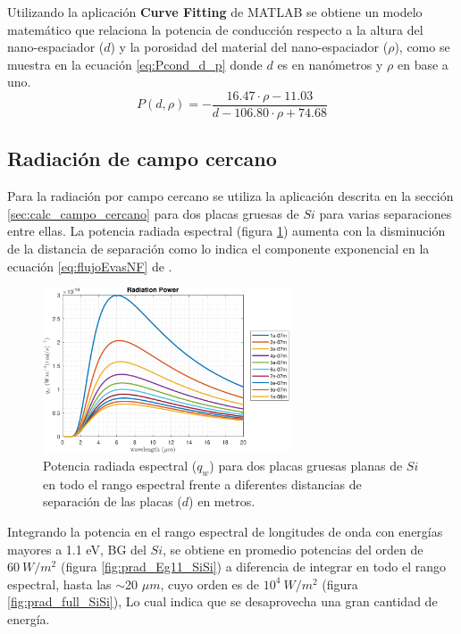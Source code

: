 Utilizando la aplicación \textbf{Curve Fitting} de MATLAB se obtiene un modelo matemático que relaciona la potencia de conducción respecto a la altura del nano-espaciador ($d$) y la porosidad del material del nano-espaciador ($\rho$), como se muestra en la ecuación \eqref{eq:Pcond_d_p} donde $d$ es en nanómetros y $\rho$ en base a uno.
\begin{equation}
P(d,\rho)=- \frac{  16.47\cdot \rho-11.03 }{d-106.80\cdot \rho +74.68}
\label{eq:Pcond_d_p}
\end{equation}\vspace{2cm}
\subsection{Radiación de campo cercano}
Para la radiación por campo cercano se utiliza la aplicación descrita en la sección \ref{sec:calc_campo_cercano} para dos placas gruesas de $Si$ para varias separaciones entre ellas. La potencia radiada espectral (figura \ref{fig:rad_SiSi_ds}) aumenta con la disminución de la distancia de separación como lo indica el componente exponencial en la ecuación \eqref{eq:flujoEvasNF} de \cite{nfTPV_equations}.
\begin{figure}[H]
	\centering
		\includegraphics[width=0.65\textwidth]{figuras/Resultados/radiacion/SiSi_ds.pdf}
	\caption{Potencia radiada espectral ($q_w$) para dos placas gruesas planas de $Si$ en todo el rango espectral frente a diferentes distancias de separación de las placas ($d$) en metros.\sourceSpectralRadiation}
	\label{fig:rad_SiSi_ds}
\end{figure}
Integrando la potencia en el rango espectral de longitudes de onda con energías mayores a 1.1 eV, BG del $Si$, se obtiene en promedio potencias del orden de $60 \ W/m^2$ (figura \ref{fig:prad_Eg11_SiSi}) a diferencia de integrar en todo el rango espectral, hasta las $\sim$20 $\mu m$, cuyo orden es de $10^4 \ W/m^2$ (figura \ref{fig:prad_full_SiSi}), Lo cual indica que se desaprovecha una gran cantidad de energía.
